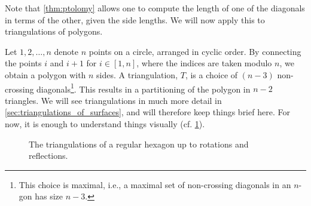 \begin{example}\label{exmp:triangulations}

	Note that \cref{thm:ptolomy} allows one to compute the length of one of the diagonals
	in terms of the other, given the side lengths. We will now apply this to triangulations
	of polygons.

	Let $1, 2, \dots, n$ denote $n$ points on a circle, arranged in cyclic order. By
	connecting the points $i$ and $i +1$ for $i \in [1, n]$, where the indices are taken
	modulo $n$, we obtain a polygon with $n$ sides. A triangulation, $T$, is a choice of $(n-3)$ non-crossing diagonals\footnote{This choice is
		maximal, i.e., a maximal set of non-crossing diagonals in an $n$-gon has size $n-3$.}.
	This results in a partitioning of the polygon in $n-2$ triangles. We will see
	triangulations in much more detail in \cref{sec:triangulations_of_surfaces}, and will
	therefore keep things brief here. For now, it is enough to understand things visually
	(cf. \cref{fig:hexagon_triangulations}).
	\begin{figure}[ht]
		\centering

		\caption{The triangulations of a regular hexagon up to rotations and reflections.}
		\label{fig:hexagon_triangulations}
	\end{figure}


\end{example}
